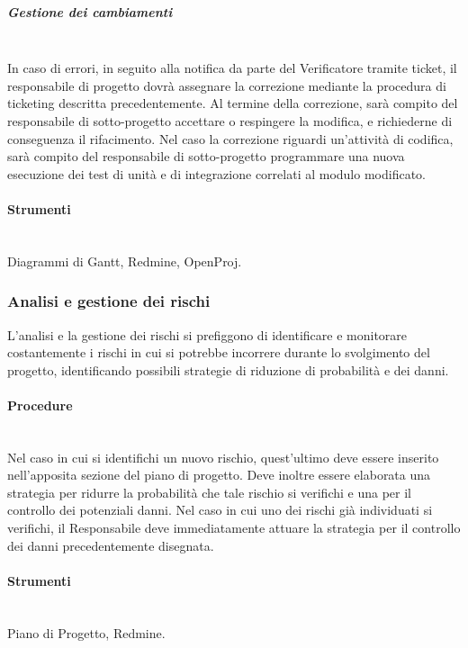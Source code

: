 \subparagraph{Gestione dei cambiamenti} \hfill \\

In caso di errori, in seguito alla notifica da parte del Verificatore tramite ticket, il responsabile di progetto dovrà assegnare la correzione mediante la procedura di
ticketing descritta precedentemente.
Al termine della correzione, sarà compito del responsabile di sotto-progetto accettare o respingere la modifica, e richiederne di conseguenza il rifacimento.
Nel caso la correzione riguardi un’attivit\`{a} di codifica, sarà compito del responsabile di sotto-progetto programmare una nuova esecuzione dei test di unità e di integrazione correlati al modulo modificato.



\paragraph{Strumenti} \hfill \\
Diagrammi di Gantt, Redmine, OpenProj.


\subsubsection{Analisi e gestione dei rischi}

L'analisi e la gestione dei rischi si prefiggono di identificare e  monitorare costantemente i rischi in cui si potrebbe incorrere durante lo svolgimento del progetto, identificando possibili strategie di riduzione di probabilità e dei danni. 


\paragraph{Procedure} \hfill \\
Nel caso in cui si identifichi un nuovo rischio, quest'ultimo deve essere inserito nell'apposita sezione del piano di progetto. Deve inoltre essere elaborata una strategia per ridurre la probabilità che tale rischio si verifichi e una per il controllo dei potenziali danni.
Nel caso in cui uno dei rischi già individuati si verifichi, il Responsabile deve immediatamente attuare la strategia per il controllo dei danni precedentemente disegnata.

\paragraph{Strumenti} \hfill \\
Piano di Progetto, Redmine.


